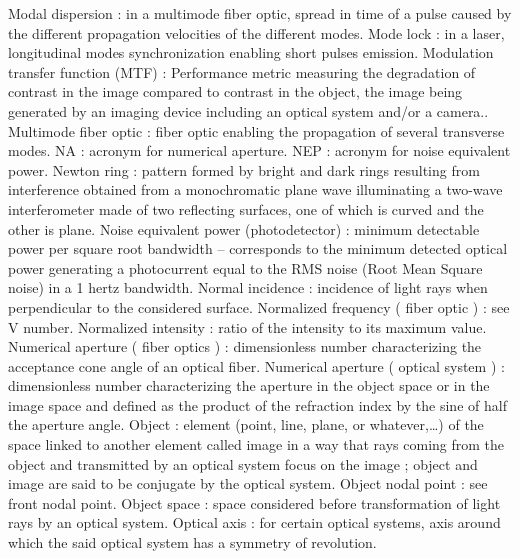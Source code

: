 Modal dispersion                                     : in a multimode fiber optic, spread in time of a pulse caused by the different propagation velocities of the different modes.
Mode lock                                            : in a laser, longitudinal modes synchronization enabling short pulses emission.
Modulation transfer function (MTF)                   : Performance metric measuring the degradation of contrast in the image compared to contrast in the object, the image being generated by an imaging device including an optical system and/or a camera..
Multimode fiber optic                                : fiber optic enabling the propagation of several transverse modes.
NA                                                   : acronym for numerical aperture.
NEP                                                  : acronym for noise equivalent power.
Newton ring                                          : pattern formed by bright and dark rings resulting from interference obtained from a monochromatic plane wave illuminating a two-wave interferometer made of two reflecting surfaces, one of which is curved and the other is plane.
Noise equivalent power (photodetector)               : minimum detectable power per square root bandwidth – corresponds to the minimum detected optical power generating a photocurrent equal to the RMS noise (Root Mean Square noise) in a 1 hertz bandwidth.
Normal incidence                                     : incidence of light rays when perpendicular to the considered surface.
Normalized frequency ( fiber optic )                 : see V number.
Normalized intensity                                 : ratio of the intensity to its maximum value.
Numerical aperture ( fiber optics )                  : dimensionless number characterizing the acceptance cone angle of an optical fiber.
Numerical aperture ( optical system )                : dimensionless number characterizing the aperture in the object space or in the image space and defined as the product of the refraction index by the sine of half the aperture angle.
Object                                               : element (point, line, plane, or whatever,…) of the space linked to another element called image in a way that rays coming from the object and transmitted by an optical system focus on the image ; object and image are said to be conjugate by the optical system.
Object nodal point                                   : see front nodal point.
Object space                                         : space considered before transformation of light rays by an optical system.
Optical axis                                         : for certain optical systems, axis around which the said optical system has a symmetry of revolution.
